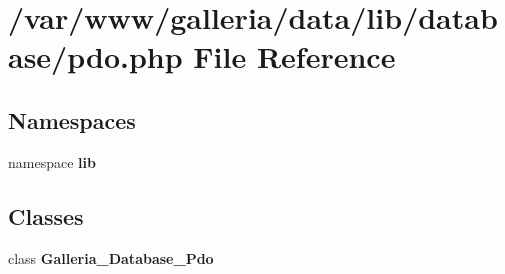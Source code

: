 \section{/var/www/galleria/data/lib/database/pdo.php File Reference}
\label{pdo_8php}
\subsection*{Namespaces}
\begin{CompactItemize}
\item 
namespace {\bf lib}
\end{CompactItemize}
\subsection*{Classes}
\begin{CompactItemize}
\item 
class {\bf Galleria\_\-Database\_\-Pdo}
\end{CompactItemize}
